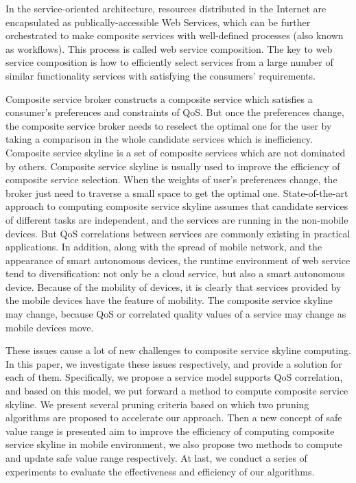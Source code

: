 \documentclass[twoside, master]{NJUthesis}
\theoremstyle{plain}
\begin{document}
\begin{englishabstract}

In the service-oriented architecture, resources distributed in the Internet are encapsulated as publically-accessible Web Services, which can be further orchestrated to make composite services with well-defined processes (also known as workflows). This process is called web service composition. The key to web service composition is how to efficiently select services from a large number of similar functionality services with satisfying the consumers' requirements.

Composite service broker constructs a composite service which satisfies a consumer's preferences and constraints of QoS. But once the preferences change, the composite service broker needs to reselect the optimal one for the user by taking a comparison in the whole candidate services which is inefficiency. Composite service skyline is a set of composite services which are not dominated by others. Composite service skyline is usually used to improve the efficiency of composite service selection. When the weights of user's preferences change, the broker just need to traverse a small space to get the optimal one. State-of-the-art approach to computing composite service skyline assumes that candidate services of different tasks are independent, and the services are running in the non-mobile devices. But QoS correlations between services are commonly existing in practical applications. In addition, along with the spread of mobile network, and the appearance of smart autonomous devices, the runtime environment of web service tend to diversification: not only be a cloud service, but also a smart autonomous device. Because of the mobility of devices, it is clearly that services provided by the mobile devices have the feature of mobility. The composite service skyline may change, because QoS or correlated quality values of a service may change as mobile devices move.

These issues cause a lot of new challenges to composite service skyline computing. In this paper, we investigate these issues respectively, and provide a solution for each of them. Specifically, we propose a service model supports QoS correlation, and based on this model, we put forward a method to compute composite service skyline. We present several pruning criteria based on which two pruning algorithms are proposed to accelerate our approach. Then a new concept of safe value range is presented aim to improve the efficiency of computing composite service skyline in mobile environment, we also propose two methods to compute and update safe value range respectively. At last, we conduct a series of experiments to evaluate the effectiveness and efficiency of our algorithms.



\end{englishabstract}
\end{document}
